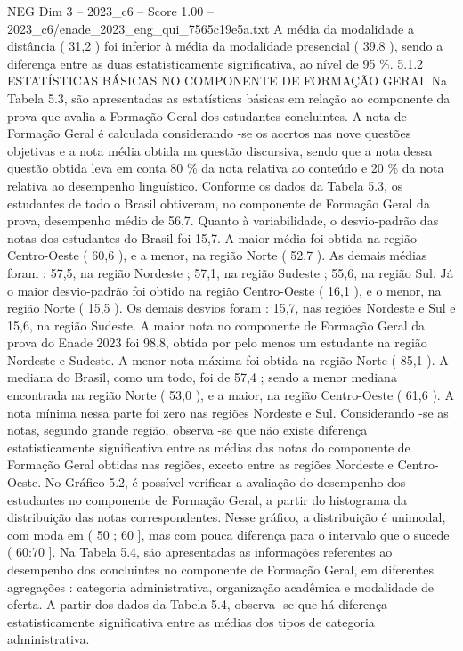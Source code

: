 \begin{textsample}{NEG Dim 3 – 2023\_c6 – Score 1.00 – 2023\_c6/enade\_2023\_eng\_qui\_7565c19e5a.txt}
A média da modalidade a distância ( 31,2 ) foi inferior à média da modalidade presencial ( 39,8 ), sendo a diferença entre as duas estatisticamente significativa, ao nível de 95 \%. 5.1.2 ESTATÍSTICAS BÁSICAS NO COMPONENTE DE FORMAÇÃO GERAL Na Tabela 5.3, são apresentadas as estatísticas básicas em relação ao componente da prova que avalia a Formação Geral dos estudantes concluintes.
A nota de Formação Geral é calculada considerando -se os acertos nas nove questões objetivas e a nota média obtida na questão discursiva, sendo que a nota dessa questão obtida leva em conta 80 \% da nota relativa ao conteúdo e 20 \% da nota relativa ao desempenho linguístico.
Conforme os dados da Tabela 5.3, os estudantes de todo o Brasil obtiveram, no componente de Formação Geral da prova, desempenho médio de 56,7.
Quanto à variabilidade, o desvio-padrão das notas dos estudantes do Brasil foi 15,7.
A maior média foi obtida na região Centro-Oeste ( 60,6 ), e a menor, na região Norte ( 52,7 ).
As demais médias foram : 57,5, na região Nordeste ; 57,1, na região Sudeste ; 55,6, na região Sul.
Já o maior desvio-padrão foi obtido na região Centro-Oeste ( 16,1 ), e o menor, na região Norte ( 15,5 ).
Os demais desvios foram : 15,7, nas regiões Nordeste e Sul e 15,6, na região Sudeste.
A maior nota no componente de Formação Geral da prova do Enade 2023 foi 98,8, obtida por pelo menos um estudante na região Nordeste e Sudeste.
A menor nota máxima foi obtida na região Norte ( 85,1 ).
A mediana do Brasil, como um todo, foi de 57,4 ; sendo a menor mediana encontrada na região Norte ( 53,0 ), e a maior, na região Centro-Oeste ( 61,6 ).
A nota mínima nessa parte foi zero nas regiões Nordeste e Sul.
Considerando -se as notas, segundo grande região, observa -se que não existe diferença estatisticamente significativa entre as médias das notas do componente de Formação Geral obtidas nas regiões, exceto entre as regiões Nordeste e Centro-Oeste.
No Gráfico 5.2, é possível verificar a avaliação do desempenho dos estudantes no componente de Formação Geral, a partir do histograma da distribuição das notas correspondentes.
Nesse gráfico, a distribuição é unimodal, com moda em ( 50 ; 60 ], mas com pouca diferença para o intervalo que o sucede ( 60:70 ].
Na Tabela 5.4, são apresentadas as informações referentes ao desempenho dos concluintes no componente de Formação Geral, em diferentes agregações : categoria administrativa, organização acadêmica e modalidade de oferta.
A partir dos dados da Tabela 5.4, observa -se que há diferença estatisticamente significativa entre as médias dos tipos de categoria administrativa.

\end{textsample}
